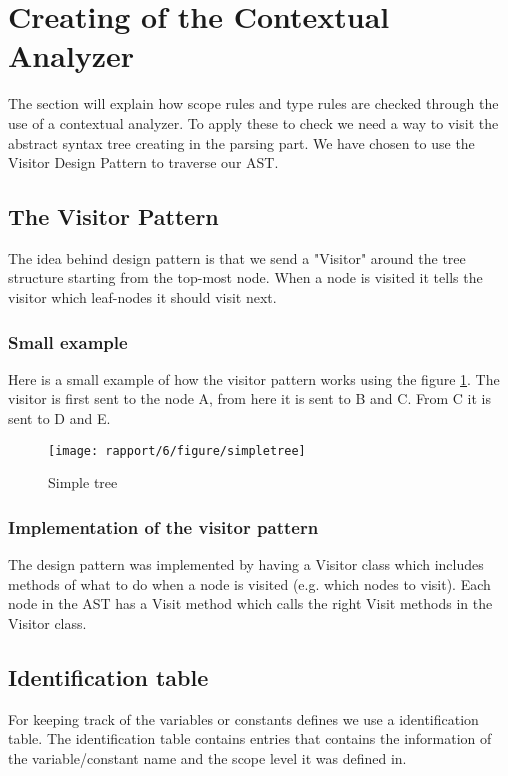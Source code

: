 \section{Creating of the Contextual Analyzer}
	The section will explain how scope rules and type rules are checked through the use of a contextual analyzer.
	To apply these to check we need a way to visit the abstract syntax tree creating in the parsing part. We have chosen to use 
	the Visitor Design Pattern to traverse our AST.
	
	\subsection{The Visitor Pattern}
		The idea behind design pattern is that we send a "Visitor" around the tree structure starting from the top-most node. When a node is 
		visited it tells the visitor which leaf-nodes it should visit next. \\
		
		\subsubsection*{Small example}
			Here is a small example of how the visitor pattern works using the figure \ref{fig:simpletree}. 
			The visitor is first sent to the node A, from here it is sent to B and C. From C it is sent to D and E.
		
			\begin{figure}
				\centering
				\texttt{[image: rapport/6/figure/simpletree]}
				\caption{Simple tree} \label{fig:simpletree}
			\end{figure}
			
		\subsubsection{Implementation of the visitor pattern}
			The design pattern was implemented by having a Visitor class which includes methods of what to do when a node is visited 
			(e.g. which nodes to visit). Each node in the AST has a Visit method which calls the right Visit methods in the Visitor class. \\
	
	\subsection{Identification table}
		For keeping track of the variables or constants defines we use a identification table. The identification table contains entries
		that contains the information of the variable/constant name and the scope level it was defined in.
		
